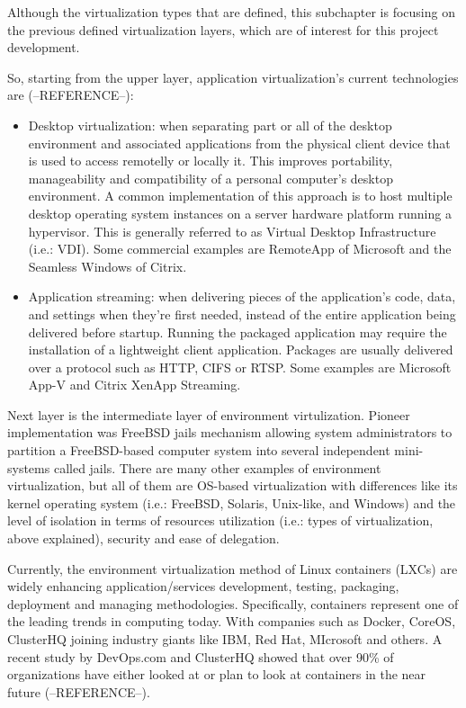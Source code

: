 Although the virtualization types that are defined, this subchapter is focusing on the previous defined virtualization layers, which are of interest for this project development.

So, starting from the upper layer, application virtualization's current technologies are (--REFERENCE--):

\begin{itemize}
\item Desktop virtualization: when separating part or all of the desktop environment and associated applications from the physical client device that is used to access remotelly or locally it. This improves portability, manageability and compatibility of a personal computer's desktop environment. A common implementation of this approach is to host multiple desktop operating system instances on a server hardware platform running a hypervisor. This is generally referred to as Virtual Desktop Infrastructure (i.e.: VDI). Some commercial examples are RemoteApp of Microsoft and the Seamless Windows of Citrix. 
\item Application streaming: when delivering pieces of the application's code, data, and settings when they're first needed, instead of the entire application being delivered before startup. Running the packaged application may require the installation of a lightweight client application. Packages are usually delivered over a protocol such as HTTP, CIFS or RTSP. Some examples are Microsoft App-V and Citrix XenApp Streaming.
\end{itemize}

Next layer is the intermediate layer of environment virtulization. Pioneer implementation was FreeBSD jails mechanism allowing system administrators to partition a FreeBSD-based computer system into several independent mini-systems called jails. There are many other examples of environment virtualization, but all of them are OS-based virtualization with differences like its kernel operating system (i.e.: FreeBSD, Solaris, Unix-like, and Windows) and the level of isolation in terms of resources utilization (i.e.: types of virtualization, above explained), security and ease of delegation. 

Currently, the environment virtualization method of Linux containers (LXCs) are widely enhancing application/services development, testing, packaging, deployment and managing methodologies. Specifically, containers represent one of the leading trends in computing today. With companies such as Docker, CoreOS, ClusterHQ joining industry giants like IBM, Red Hat, MIcrosoft and others. A recent study by DevOps.com and ClusterHQ showed that over 90\% of organizations have either looked at or plan to look at containers in the near future (--REFERENCE--).

